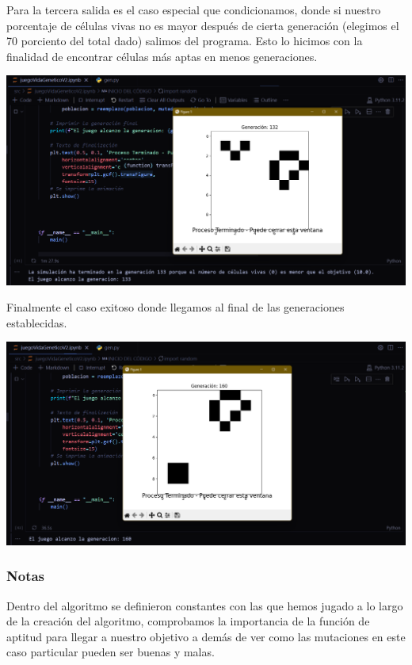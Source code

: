 Para la tercera salida es el caso especial que condicionamos, donde si nuestro 
porcentaje de células vivas no es mayor después de cierta generación (elegimos
el 70 porciento del total dado) salimos del programa. Esto lo hicimos con la 
finalidad de encontrar células más aptas en menos generaciones. 
\begin{center}
    \includegraphics[scale = .4]{IMA/condicionEspecial.png}
\end{center}

Finalmente el caso exitoso donde llegamos al final de las generaciones establecidas. 
\begin{center}
    \includegraphics[scale = .4]{IMA/casoExitoso.png}
\end{center}

\subsubsection*{Notas}


Dentro del algoritmo se definieron constantes con las que hemos jugado a lo largo de 
la creación del algoritmo, comprobamos la importancia de la función de aptitud para
llegar a nuestro objetivo a demás de ver como las mutaciones en este caso particular 
pueden ser buenas y malas. 

